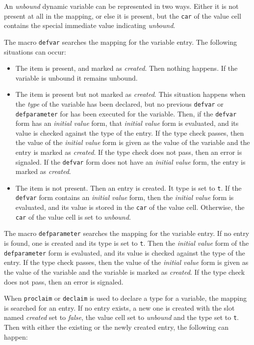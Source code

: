 An \emph{unbound} dynamic variable can be represented in two ways.
Either it is not present at all in the mapping, or else it is present,
but the \texttt{car} of the value cell contains the special immediate
value indicating \emph{unbound}.  

The macro \texttt{defvar} searches the mapping for the variable entry.
The following situations can occur:
\begin{itemize}
\item The item is present, and marked as \emph{created}.  Then nothing
  happens.  If the variable is unbound it remains unbound.
\item The item is present but not marked as \emph{created}.  This
  situation happens when the \emph{type} of the variable has been
  declared, but no previous \texttt{defvar} or \texttt{defparameter}
  for has been executed for the variable.  Then, if the
  \texttt{defvar} form has an \emph{initial value} form, that
  \emph{initial value} form is evaluated, and its value is checked
  against the type of the entry.  If the type check passes, then the
  value of the \emph{initial value} form is given as the value of the
  variable and the entry is marked as \emph{created}.  If the type
  check does not pass, then an error is signaled.  If the
  \texttt{defvar} form does not have an \emph{initial value} form, the
  entry is marked as \emph{created}.
\item The item is not present.  Then an entry is created.  It type is
  set to \texttt{t}.  If the \texttt{defvar} form contains
  an \emph{initial value} form, then the \emph{initial value} form is
  evaluated, and its value is stored in the \texttt{car} of the value
  cell.  Otherwise, the \texttt{car} of the value cell is set to
  \emph{unbound}. 
\end{itemize}

The macro \texttt{defparameter} searches the mapping for the variable
entry.  If no entry is found, one is created and its type is set to
\texttt{t}.  Then the \emph{initial value} form of the
\texttt{defparameter} form is evaluated, and its value is checked
against the type of the entry.  If the type check passes, then the
value of the \emph{initial value} form is given as the value of the
variable and the variable is marked as \emph{created}.  If the type
check does not pass, then an error is signaled.

When \texttt{proclaim} or \texttt{declaim} is used to declare a type
for a variable, the mapping is searched for an entry.  If no entry
exists, a new one is created with the slot named \emph{created} set to
\emph{false}, the value cell set to \emph{unbound} and the type set to
\texttt{t}.  Then with either the existing or the newly created entry,
the following can happen:

